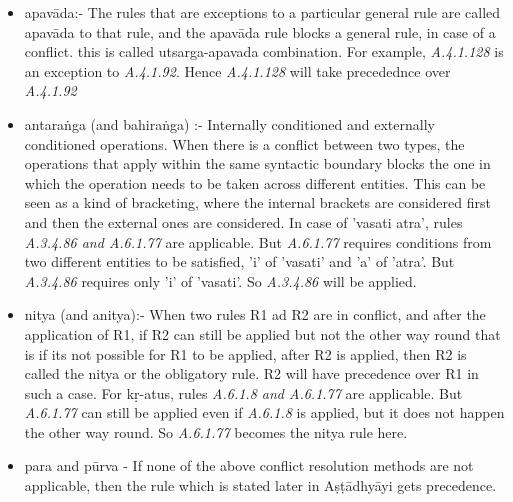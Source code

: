 \documentclass[a4paper,11pt,twoside,openright]{report}
\begin{document}
\begin{itemize}

\item apavāda:- The rules that are exceptions to a particular general rule are called apavāda to that rule, and the apavāda rule blocks a general rule, in case of a conflict. this is called utsarga-apavada combination. For example, \textsl{ A.4.1.128} is an exception to \textsl{ A.4.1.92}. Hence \textsl{ A.4.1.128}  will take precedednce over \textsl{ A.4.1.92}

\item antaraṅga (and bahiraṅga) :- Internally conditioned and externally conditioned operations. When there is a conflict between two types, the operations that apply within the same syntactic boundary blocks the one in which the operation needs to be taken across different entities. This can be seen as a kind of bracketing, where the internal brackets are considered first and then the external ones are considered. In case of 'vasati atra', rules \textsl{ A.3.4.86 and A.6.1.77} are applicable. But \textsl{ A.6.1.77} requires conditions from two different entities to be satisfied, 'i' of 'vasati' and 'a' of 'atra'. But \textsl{ A.3.4.86} requires only 'i' of 'vasati'. So \textsl{ A.3.4.86} will be applied. 

\item nitya (and anitya):- When two rules R1 ad R2 are in conflict, and after the application of R1, if R2 can still be applied but not the other way round that is if its not possible for R1 to be applied, after R2 is applied, then R2 is called the nitya or the obligatory rule. R2 will have precedence over R1 in such a case. For kṛ-atus, rules \textsl{ A.6.1.8 and A.6.1.77} are applicable. But \textsl{ A.6.1.77} can still be applied even if \textsl{ A.6.1.8} is applied, but it does not happen the other way round. So \textsl{ A.6.1.77} becomes the nitya rule here.


\item para and pūrva - If none of the above conflict resolution methods are not applicable, then the rule which is stated later in Aṣṭādhyāyi gets precedence.


\end{itemize}
\end{document}

